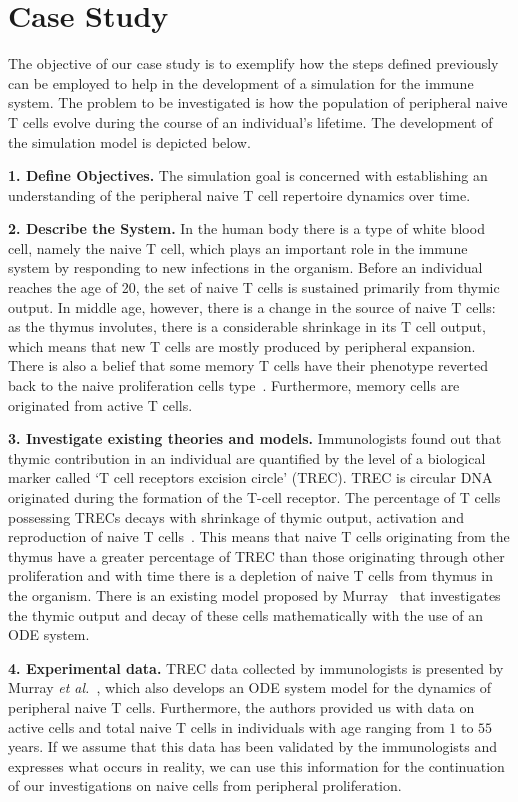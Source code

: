 \documentclass{llncs}
\begin{document}
\section{Case Study}
\label{CaseStudy}

The objective of our case study is to exemplify how the steps defined previously can be employed to help in the development of a simulation for the immune system. The problem to be investigated  is how the population of peripheral naive T cells evolve during the course of an individual's lifetime. The development of the simulation model is depicted below.

{\bf 1. Define Objectives.} The simulation goal is concerned with establishing an understanding of the peripheral naive T cell repertoire dynamics over time.

{\bf 2. Describe the System.} In the human body there is a type of white blood cell, namely the naive T cell, which plays an important role in the immune system by responding to new infections in the organism. Before an individual reaches the age of 20, the set of naive T cells is sustained primarily from thymic output. In middle age, however, there is a change in the source of naive T cells: as the thymus involutes, there is a considerable shrinkage in its T cell output, which means that new T cells are mostly produced by peripheral expansion. There is also a belief that some memory T cells have their phenotype reverted back to the naive proliferation cells type~\cite{Murray:2003}. Furthermore, memory cells are originated from active T cells.

{\bf 3. Investigate existing theories and models.} Immunologists found out that thymic contribution in an individual are quantified by the level of a biological marker called `T cell receptors excision circle' (TREC). TREC is circular DNA originated during the formation of the T-cell receptor. The percentage of T cells possessing TRECs decays with shrinkage of thymic output, activation and reproduction of naive T cells~\cite{Murray:2003}. This means that naive T cells originating from the thymus have a greater percentage of TREC than those originating through other proliferation and with time there is a depletion of naive T cells from thymus in the organism. There is an existing model proposed by Murray~\cite{Murray:2003} that investigates the thymic output and decay of these cells mathematically with the use of an ODE system.

{\bf 4. Experimental data.} TREC data collected by immunologists is presented by Murray {\it et al.}~\cite{Murray:2003}, which also develops an ODE system model for the dynamics of peripheral naive T cells. Furthermore, the authors provided us with data on active cells and total naive T cells in individuals with age ranging from $1$ to $55$ years. If we assume that this data has been validated by the immunologists and expresses what occurs in reality, we can use this information for the continuation of our investigations on naive cells from peripheral proliferation.
\end{document}
